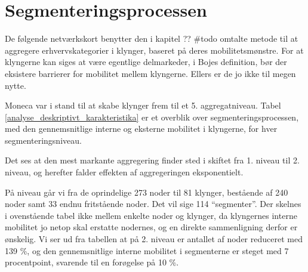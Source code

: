 %  
% 


\section{Segmenteringsprocessen \label{analyse_deskriptivt_segmenteringsproces}}

De følgende netværkskort benytter den i kapitel ?? \#todo omtalte metode til at aggregere erhvervskategorier i klynger, baseret på deres mobilitetsmønstre. For at klyngerne kan siges at være egentlige delmarkeder, i Bojes definition, bør der eksistere barrierer for mobilitet mellem klyngerne. Ellers er de jo ikke til megen nytte.

Moneca var i stand til at skabe klynger frem til et 5. aggregatniveau. Tabel \ref{analyse_deskriptivt_karakteristika}  er et overblik over segmenteringsprocessen, med den gennemsnitlige interne og eksterne mobilitet i klyngerne, for hver segmenteringsniveau.

% 
\begin{table}[H] \centering
\caption{Karakteristika for segmenteringsprocessen}
\label{tab_analyse_deskriptivt_karakteristika}
\end{table}
%

Det ses at den mest markante aggregering finder sted i skiftet fra 1. niveau til 2. niveau, og herefter falder effekten af aggregeringen eksponentielt. 

På niveau går vi fra de oprindelige 273 noder til 81 klynger, bestående af 240 noder samt 33 endnu fritstående noder. Det vil sige 114 “segmenter”. Der skelnes i ovenstående tabel ikke mellem enkelte noder og klynger, da klyngernes interne mobilitet jo netop skal erstatte nodernes, og en direkte sammenligning derfor er ønskelig.
Vi ser ud fra tabellen at på 2. niveau er antallet af noder reduceret med 139 \%, og den gennemsnitlige interne mobilitet i segmenterne er steget med 7 procentpoint, svarende til en forøgelse på 10 \%. 

